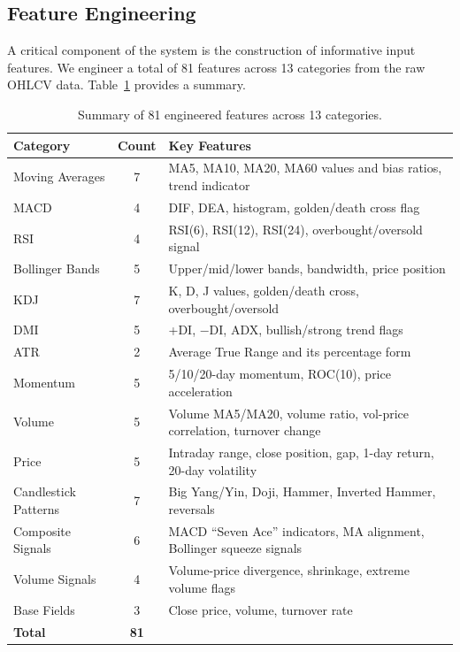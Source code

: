 \documentclass[12pt, a4paper]{article}
\begin{document}
\subsection{Feature Engineering}

A critical component of the system is the construction of informative input features. We engineer a total of 81 features across 13 categories from the raw OHLCV data. Table~\ref{tab:features} provides a summary.

\begin{table}[htbp]
\centering
\caption{Summary of 81 engineered features across 13 categories.}
\label{tab:features}
\small
\begin{tabular}{p{3.5cm}cp{7cm}}
\toprule
\textbf{Category} & \textbf{Count} & \textbf{Key Features} \\
\midrule
Moving Averages    & 7  & MA5, MA10, MA20, MA60 values and bias ratios, trend indicator \\
MACD               & 4  & DIF, DEA, histogram, golden/death cross flag \\
RSI                & 4  & RSI(6), RSI(12), RSI(24), overbought/oversold signal \\
Bollinger Bands    & 5  & Upper/mid/lower bands, bandwidth, price position \\
KDJ                & 7  & K, D, J values, golden/death cross, overbought/oversold \\
DMI                & 5  & +DI, $-$DI, ADX, bullish/strong trend flags \\
ATR                & 2  & Average True Range and its percentage form \\
Momentum           & 5  & 5/10/20-day momentum, ROC(10), price acceleration \\
Volume             & 5  & Volume MA5/MA20, volume ratio, vol-price correlation, turnover change \\
Price              & 5  & Intraday range, close position, gap, 1-day return, 20-day volatility \\
Candlestick Patterns & 7  & Big Yang/Yin, Doji, Hammer, Inverted Hammer, reversals \\
Composite Signals  & 6  & MACD ``Seven Ace'' indicators, MA alignment, Bollinger squeeze signals \\
Volume Signals     & 4  & Volume-price divergence, shrinkage, extreme volume flags \\
\midrule
Base Fields        & 3  & Close price, volume, turnover rate \\
\midrule
\textbf{Total}     & \textbf{81} &  \\
\bottomrule
\end{tabular}
\end{table}
\end{document}
